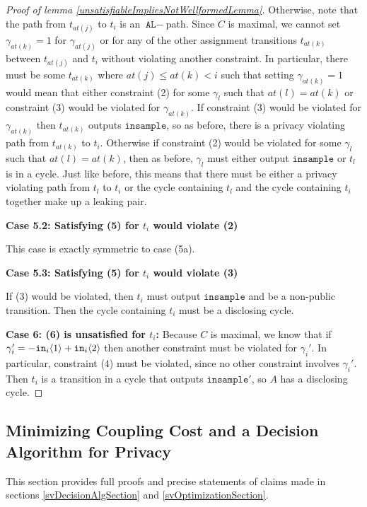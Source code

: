 \begin{proof}[Proof of lemma \ref{unsatisfiableImpliesNotWellformedLemma}]
    Otherwise, note that the path from $t_{at(j)}$ to $t_i$ is an $\texttt{AL}-$path. Since $C$ is maximal, we cannot set $\gamma_{at(k)}=1$ for $\gamma_{at(j)}$ or for any of the other assignment transitions $t_{at(k)}$ between $t_{at(j)}$ and $t_i$ without violating another constraint. 
    In particular, there must be some $t_{at(k)}$ where $at(j)\leq at(k)<i$ such that setting $\gamma_{at(k)} = 1$ would mean that either constraint (2) for some $\gamma_l$ such that $at(l) = at(k)$ or constraint (3) would be violated for $\gamma_{at(k)}$. 
    If constraint (3) would be violated for $\gamma_{at(k)}$ then $t_{at(k)}$ outputs $\texttt{insample}$, so as before, there is a privacy violating path from $t_{at(k)}$ to $t_i$. Otherwise if constraint (2) would be violated for some $\gamma_l$ such that $at(l) = at(k)$, then as before, $\gamma_l$ must either output $\texttt{insample}$ or $t_l$ is in a cycle. 
    Just like before, this means that there must be either a privacy violating path from $t_l$ to $t_i$ or the cycle containing $t_l$ and the cycle containing $t_i$ together make up a leaking pair. 

    \textbf{Case 5.2: Satisfying (5) for $t_i$ would violate (2)}

    This case is exactly symmetric to case (5a).

    \textbf{Case 5.3: Satisfying (5) for $t_i$ would violate (3)}

    If (3) would be violated, then $t_i$ must output $\texttt{insample}$ and be a non-public transition. Then the cycle containing $t_i$ must be a disclosing cycle. 
    
    \textbf{Case 6: (6) is unsatisfied for $t_i$:} Because $C$ is maximal, we know that if $\gamma_i' = -\texttt{in}_i\langle1 \rangle+\texttt{in}_i\langle2 \rangle$ then another constraint must be violated for $\gamma_i'$. In particular, constraint (4) must be violated, since no other constraint involves $\gamma_i'$. 
    Then $t_i$ is a transition in a cycle that outputs $\texttt{insample}'$, so $A$ has a disclosing cycle.
\end{proof}


\subsection{Minimizing Coupling Cost and a Decision Algorithm for Privacy}

This section provides full proofs and precise statements of claims made in sections \ref{svDecisionAlgSection} and \ref{svOptimizationSection}.

